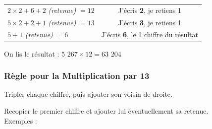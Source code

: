 \documentclass[a4paper, twoside]{article}
\begin{document}
\begin{small}
\begin{enumerate}
\begin{tabular}{l|c}
				\tabularnewline
				
				$2 \times 2 + 6 + 2$ \textit{(retenue)} $= 12$ & J'écris \textbf{2}, je retiens 1
				
				
				\tabularnewline
				
				$5 \times 2 + 2 + 1$ \textit{(retenue)} $= 13$ & J'écris \textbf{3}, je retiens 1
				
				
				\tabularnewline
				
				$5 + 1$ \textit{(retenue)} $= 6$ & J'écris \textbf{6}, le 1\up{er} chiffre du résultat
				
			\end{tabular}
			
			On lis le résultat : {\boldmath $5$ $267 \times 12 = 63$ $204$}\\

		\end{enumerate}
		\end{small}


		\vfill
		{\noindent \dotfill}


		\subsubsection*{Règle pour la Multiplication par 13}

		Tripler chaque chiffre, puis ajouter son voisin de droite.

		Recopier le premier chiffre et ajouter lui éventuellement sa retenue.\\

		{ \parindent=0.5cm Exemples : }
\end{document}
